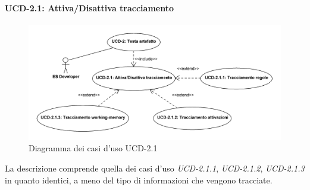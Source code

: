 \paragraph{UCD-2.1: Attiva/Disattiva tracciamento}

\begin{figure}
\centering
\includegraphics[width=1.1\textwidth]{Immagini/Capitolo2/UseCases/UCD-2_1.png}
\caption{Diagramma dei casi d'uso UCD-2.1}\label{fig:uc-ucd-2.1}
\end{figure}

La descrizione comprende quella dei casi d'uso \emph{UCD-2.1.1}, \emph{UCD-2.1.2}, \emph{UCD-2.1.3} in quanto identici, a meno del tipo di informazioni che vengono tracciate.


